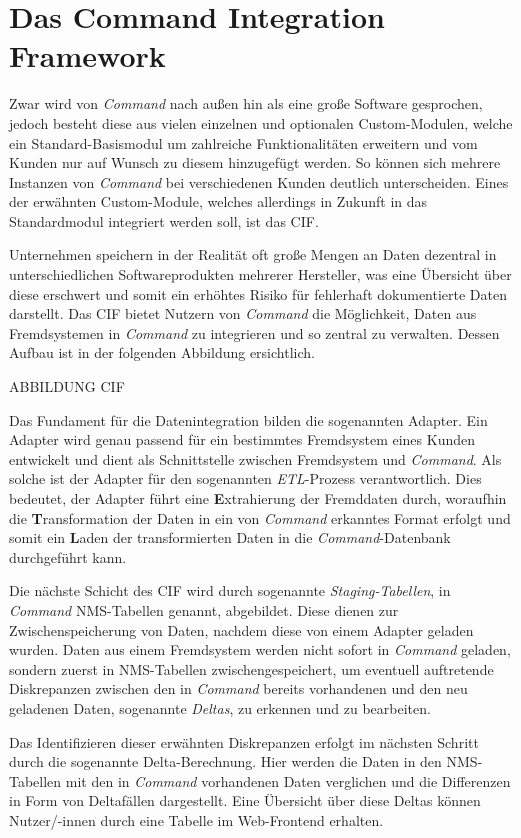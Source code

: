 \section{Das Command Integration Framework}\label{sec:cif}
Zwar wird von \textit{Command} nach außen hin als eine große Software gesprochen, jedoch besteht diese aus vielen einzelnen und optionalen Custom-Modulen, welche ein Standard-Basismodul um zahlreiche Funktionalitäten erweitern und vom Kunden nur auf Wunsch zu diesem hinzugefügt werden. So können sich mehrere Instanzen von \textit{Command} bei verschiedenen Kunden deutlich unterscheiden. Eines der erwähnten Custom-Module, welches allerdings in Zukunft in das Standardmodul integriert werden soll, ist das \ac{CIF}.

Unternehmen speichern in der Realität oft große Mengen an Daten dezentral in unterschiedlichen Softwareprodukten mehrerer Hersteller, was eine Übersicht über diese erschwert und somit ein erhöhtes Risiko für fehlerhaft dokumentierte Daten darstellt. Das \ac{CIF} bietet Nutzern von \textit{Command} die Möglichkeit, Daten aus Fremdsystemen in \textit{Command} zu integrieren und so zentral zu verwalten. Dessen Aufbau ist in der folgenden Abbildung ersichtlich.

ABBILDUNG CIF

Das Fundament für die Datenintegration bilden die sogenannten Adapter. Ein Adapter wird genau passend für ein bestimmtes Fremdsystem eines Kunden entwickelt und dient als Schnittstelle zwischen Fremdsystem und \textit{Command}. Als solche ist der Adapter für den sogenannten \textit{ETL}-Prozess verantwortlich. Dies bedeutet, der Adapter führt eine \textbf{E}xtrahierung der Fremddaten durch, woraufhin die \textbf{T}ransformation der Daten in ein von \textit{Command} erkanntes Format erfolgt und somit ein \textbf{L}aden der transformierten Daten in die \textit{Command}-Datenbank durchgeführt kann.

Die nächste Schicht des \ac{CIF} wird durch sogenannte \textit{Staging-Tabellen}, in \textit{Command} \ac{NMS}-Tabellen genannt, abgebildet. Diese dienen zur Zwischenspeicherung von Daten, nachdem diese von einem Adapter geladen wurden. Daten aus einem Fremdsystem werden nicht sofort in \textit{Command} geladen, sondern zuerst in \ac{NMS}-Tabellen zwischengespeichert, um eventuell auftretende Diskrepanzen zwischen den in \textit{Command} bereits vorhandenen und den neu geladenen Daten, sogenannte \textit{Deltas}, zu erkennen und zu bearbeiten. 

Das Identifizieren dieser erwähnten Diskrepanzen erfolgt im nächsten Schritt durch die sogenannte Delta-Berechnung. Hier werden die Daten in den \ac{NMS}-Tabellen mit den in \textit{Command} vorhandenen Daten verglichen und die Differenzen in Form von Deltafällen dargestellt. Eine Übersicht über diese Deltas können Nutzer/-innen durch eine Tabelle im Web-Frontend erhalten.

